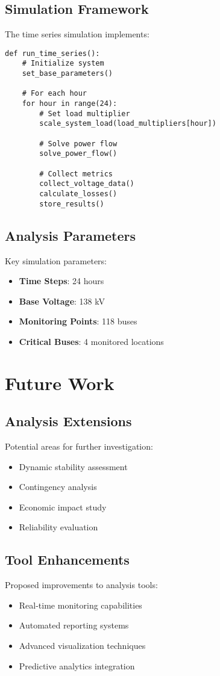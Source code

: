 \documentclass[11pt]{article}
\begin{document}
\subsection{Simulation Framework}
The time series simulation implements:
\begin{lstlisting}
def run_time_series():
    # Initialize system
    set_base_parameters()
    
    # For each hour
    for hour in range(24):
        # Set load multiplier
        scale_system_load(load_multipliers[hour])
        
        # Solve power flow
        solve_power_flow()
        
        # Collect metrics
        collect_voltage_data()
        calculate_losses()
        store_results()
\end{lstlisting}

\subsection{Analysis Parameters}
Key simulation parameters:
\begin{itemize}
    \item \textbf{Time Steps}: 24 hours
    \item \textbf{Base Voltage}: 138 kV
    \item \textbf{Monitoring Points}: 118 buses
    \item \textbf{Critical Buses}: 4 monitored locations
\end{itemize}

\section{Future Work}

\subsection{Analysis Extensions}
Potential areas for further investigation:
\begin{itemize}
    \item Dynamic stability assessment
    \item Contingency analysis
    \item Economic impact study
    \item Reliability evaluation
\end{itemize}

\subsection{Tool Enhancements}
Proposed improvements to analysis tools:
\begin{itemize}
    \item Real-time monitoring capabilities
    \item Automated reporting systems
    \item Advanced visualization techniques
    \item Predictive analytics integration
\end{itemize}
\end{document}
